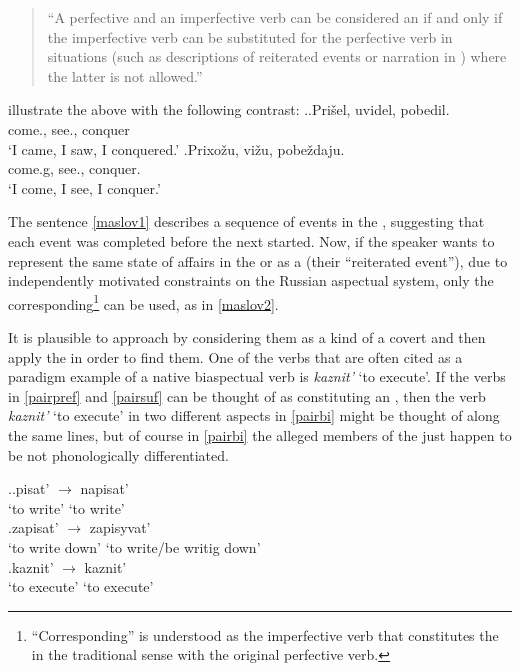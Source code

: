 \begin{quote}
``A perfective and an imperfective verb can be considered an  if and only if the imperfective verb can be substituted for the perfective verb in situations (such as descriptions of reiterated events or narration in ) where the latter is not allowed.'' 
\end{quote}

\citet{Mikaelian:07} illustrate the above with the following contrast: 
\ex.\label{maslov}\ag.\label{maslov1}Pri\v{s}el\textsuperscript{\PF}, uvidel\textsuperscript{\PF}, pobedil.\textsuperscript{\PF}\\
come., see., conquer\\
\trans `I came, I saw, I conquered.'
\bg.\label{maslov2}Prixo\v{z}u\textsuperscript{\IPF}, vi\v{z}u\textsuperscript{\IPF}, pobe\v{z}daju.\textsuperscript{\IPF}\\
come.g, see., conquer.\\
\trans `I come, I see, I conquer.'

The sentence \ref{maslov1} describes a sequence of events in the , suggesting that each event was completed before the next started. Now, if the speaker wants to represent the same state of affairs in the  or as a  (their ``reiterated event''), due to independently motivated constraints on the Russian aspectual system, only the corresponding\footnote{``Corresponding'' is understood as the imperfective verb that constitutes the  in the traditional sense with the original perfective verb.}  can be used, as in \ref{maslov2}.

It is plausible to approach  by considering them as a kind of a covert  and then apply the  in order to find them. One of the verbs that are often cited as a paradigm example of a native biaspectual verb is \emph{kaznit'} `to execute'. If the verbs in \ref{pairpref} and \ref{pairsuf} can be thought of as constituting an , then the verb \textit{kaznit'} `to execute' in two different aspects in \ref{pairbi} might be thought of along the same lines, but of course in \ref{pairbi} the alleged members of the  just happen to be not phonologically differentiated.\largerpage

\ex.\ag.\label{pairpref}{pisat'\textsuperscript{\IPF}} {$\rightarrow$} {napisat'\textsuperscript{\PF}}\\
{`to write'} {} {`to write'}\\
\bg.\label{pairsuf}{zapisat'\textsuperscript{\IPF}} {$\rightarrow$} {zapisyvat'\textsuperscript{\PF}}\\
{`to write down'} {} {`to write/be writig down'}\\
\bg.\label{pairbi}{kaznit'\textsuperscript{\IPF}} {$\rightarrow$} {kaznit'\textsuperscript{\PF}}\\
{`to execute'} {} {`to execute'}\\

